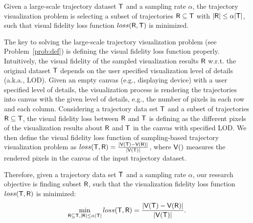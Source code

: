 \begin{problem}\label{prob:def}
Given a large-scale trajectory dataset $\mathsf{T}$ and a sampling rate $\alpha$,
the trajectory visualization problem is selecting a subset of trajectories $\mathsf{R} \subseteq \mathsf{T}$ with $|\mathsf{R}| \leq \alpha |\mathsf{T}|$,
such that visual fidelity loss function $loss(\mathsf{R},\mathsf{T})$ is minimized.
\end{problem}



The key to solving the large-scale trajectory visualization problem (see Problem~\ref{prob:def}) is defining the visual fidelity loss function properly.
Intuitively, the visual fidelity of the sampled visualization results $\mathsf{R}$ w.r.t. the original dataset $\mathsf{T}$ depends on the user specified visualization level of details (a.k.a., LOD).
Given an empty canvas (e.g., displaying device) with a user specified level of details,
the visualization process is rendering the trajectories into canvas with the given level of details, e.g., the number of pixels in each row and each column.
Considering a trajectory data set $\mathsf{T}$ and a subset of trajectories $\mathsf{R} \subseteq \mathsf{T}$,
the visual fidelity loss between $\mathsf{R}$ and $\mathsf{T}$ is defining as the different pixels of the visualization results about $\mathsf{R}$ and $\mathsf{T}$ in the canvas with specified LOD.
We then define the visual fidelity loss function of sampling-based trajectory visualization problem as $loss(\mathsf{T}, \mathsf{R}) = \frac{|\mathsf{V}(\mathsf{T}) - \mathsf{V}(\mathsf{R})|}{|\mathsf{V}(\mathsf{T})|}$,
where $\mathsf{V}()$ measures the rendered pixels in the canvas of the input trajectory dataset.

Therefore, given a trajectory data set $\mathsf{T}$ and a sampling rate $\alpha$,
our research objective is finding subset $\mathsf{R}$, such that  the visualization fidelity loss function $loss(\mathsf{T}, \mathsf{R})$ is minimized:
$$ \min_{\mathsf{R} \subseteq \mathsf{T}, |\mathsf{R}| \leq \alpha |\mathsf{T}|}  loss(\mathsf{T}, \mathsf{R}) =  \frac{|\mathsf{V}(\mathsf{T}) - \mathsf{V}(\mathsf{R})|}{|\mathsf{V}(\mathsf{T})|}. $$ %



